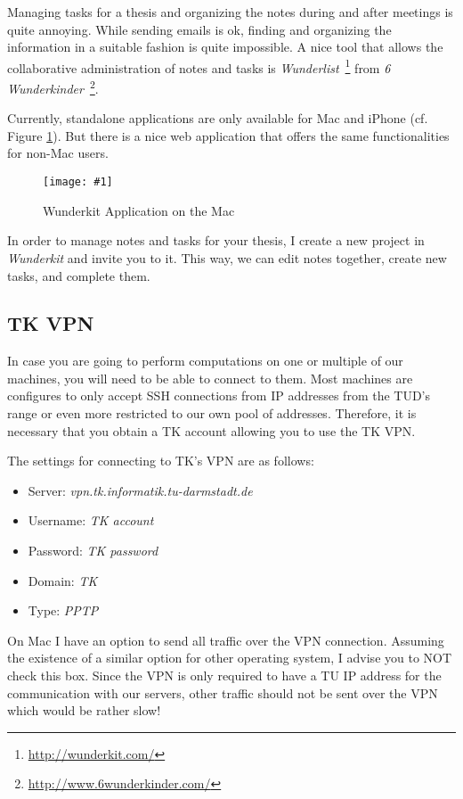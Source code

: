 \documentclass{article}
\newcommand{\img}[4]{
	\begin{figure}[!htb]
		\centering
		\texttt{[image: \#1]}
		\caption{#3}
		\label{#2}
	\end{figure}
}
\begin{document}
Managing tasks for a thesis and organizing the notes during and after meetings is quite annoying.
While sending emails is ok, finding and organizing the information in a suitable fashion is quite impossible.
A nice tool that allows the collaborative administration of notes and tasks is \emph{Wunderlist}~\footnote{\url{http://wunderkit.com/}} from \emph{6 Wunderkinder}~\footnote{\url{http://www.6wunderkinder.com/}}.

Currently, standalone applications are only available for Mac and iPhone (cf. Figure \ref{fig:wunderkit}).
But there is a nice web application that offers the same functionalities for non-Mac users.

\img{wunderkit}{fig:wunderkit}{Wunderkit Application on the Mac}{0.6}

In order to manage notes and tasks for your thesis, I create a new project in \emph{Wunderkit} and invite you to it.
This way, we can edit notes together, create new tasks, and complete them.




\subsection{TK VPN}

In case you are going to perform computations on one or multiple of our machines, you will need to be able to connect to them.
Most machines are configures to only accept SSH connections from IP addresses from the TUD's range or even more restricted to our own pool of addresses.
Therefore, it is necessary that you obtain a TK account allowing you to use the TK VPN.

The settings for connecting to TK's VPN are as follows:

\begin{itemize}
	\item Server: \emph{vpn.tk.informatik.tu-darmstadt.de}
	\item Username: \emph{TK account}
	\item Password: \emph{TK password}
	\item Domain: \emph{TK}
	\item Type: \emph{PPTP}
\end{itemize}

On Mac I have an option to send all traffic over the VPN connection.
Assuming the existence of a similar option for other operating system, I advise you to NOT check this box.
Since the VPN is only required to have a TU IP address for the communication with our servers, other traffic should not be sent over the VPN which would be rather slow!
\end{document}
